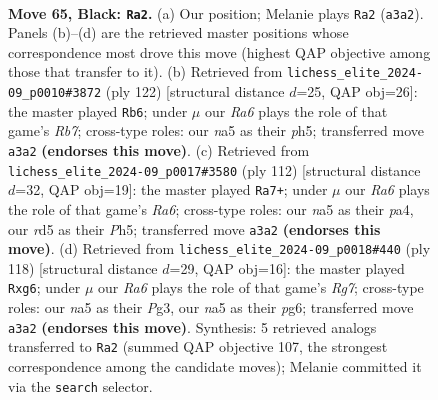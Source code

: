 \documentclass[11pt]{article}
\begin{document}
\clearpage

\begin{figure}[p]\centering
\begin{subfigure}{0.46\textwidth}\centering
\resizebox{\linewidth}{!}{%
\newchessgame
\chessboard[
  setfen={8/6p1/5pk1/N2R3p/3P3P/r5PK/8/8 b - - 24 65},
  showmover=false,
  pgfstyle=straightmove, color=movearrow, markmove={a3-a2}
]}
\caption{}
\end{subfigure}\hfill
\begin{subfigure}{0.46\textwidth}\centering
\resizebox{\linewidth}{!}{%
\newchessgame
\chessboard[
  setfen={8/1R3pk1/6p1/7p/4P2P/5PK1/6P1/7r w - - 9 62},
  showmover=false,
  pgfstyle=straightmove, color=movearrow, markmove={b7-b6}
]}
\caption{}
\end{subfigure}
\\[4pt]
\begin{subfigure}{0.46\textwidth}\centering
\resizebox{\linewidth}{!}{%
\newchessgame
\chessboard[
  setfen={8/5kp1/R4p1p/7P/pr2PKP1/5P2/8/8 w - - 3 57},
  showmover=false,
  pgfstyle=straightmove, color=movearrow, markmove={a6-a7}
]}
\caption{}
\end{subfigure}\hfill
\begin{subfigure}{0.46\textwidth}\centering
\resizebox{\linewidth}{!}{%
\newchessgame
\chessboard[
  setfen={8/p5R1/P5p1/3r3p/3k3P/5rPK/8/8 w - - 7 60},
  showmover=false,
  pgfstyle=straightmove, color=movearrow, markmove={g7-g6}
]}
\caption{}
\end{subfigure}
\caption{\textbf{Move 65, Black: \texttt{Ra2}.} (a) Our position; Melanie plays \texttt{Ra2} (\texttt{a3a2}). Panels (b)--(d) are the retrieved master positions whose correspondence most drove this move (highest QAP objective among those that transfer to it). (b) Retrieved from \texttt{lichess\_elite\_2024-09\_p0010\#3872} (ply 122) [structural distance $d$=25, QAP obj=26]: the master played \texttt{Rb6}; under $\mu$ our \emph{Ra6} plays the role of that game's \emph{Rb7}; cross-type roles: our \emph{n}a5 as their \emph{p}h5; transferred move \texttt{a3a2} \textbf{(endorses this move)}. (c) Retrieved from \texttt{lichess\_elite\_2024-09\_p0017\#3580} (ply 112) [structural distance $d$=32, QAP obj=19]: the master played \texttt{Ra7+}; under $\mu$ our \emph{Ra6} plays the role of that game's \emph{Ra6}; cross-type roles: our \emph{n}a5 as their \emph{p}a4, our \emph{r}d5 as their \emph{P}h5; transferred move \texttt{a3a2} \textbf{(endorses this move)}. (d) Retrieved from \texttt{lichess\_elite\_2024-09\_p0018\#440} (ply 118) [structural distance $d$=29, QAP obj=16]: the master played \texttt{Rxg6}; under $\mu$ our \emph{Ra6} plays the role of that game's \emph{Rg7}; cross-type roles: our \emph{n}a5 as their \emph{P}g3, our \emph{n}a5 as their \emph{p}g6; transferred move \texttt{a3a2} \textbf{(endorses this move)}. Synthesis: 5 retrieved analogs transferred to \texttt{Ra2} (summed QAP objective 107, the strongest correspondence among the candidate moves); Melanie committed it via the \texttt{search} selector.}
\label{fig:thought-m129}
\end{figure}
\end{document}
